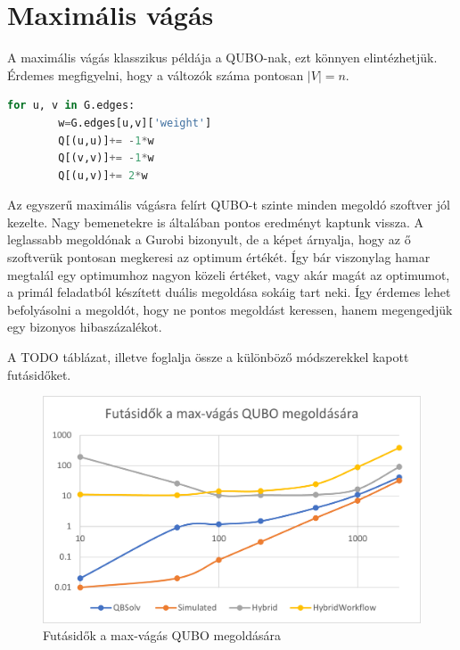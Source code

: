 \section{Maximális vágás}

A maximális vágás klasszikus példája a QUBO-nak, ezt könnyen elintézhetjük.
Érdemes megfigyelni, hogy a változók száma pontosan $|V|=n$.

\begin{lstlisting}[language=python,caption=Max-cut QUBO,label=code:maxCutQUBO]
	for u, v in G.edges:
		w=G.edges[u,v]['weight']
		Q[(u,u)]+= -1*w
		Q[(v,v)]+= -1*w
		Q[(u,v)]+= 2*w
\end{lstlisting}


Az egyszerű maximális vágásra felírt QUBO-t szinte minden megoldó szoftver jól kezelte. Nagy bemenetekre is általában pontos eredményt kaptunk vissza. A leglassabb megoldónak a Gurobi bizonyult, de a képet árnyalja, hogy az ő szoftverük pontosan megkeresi az optimum értékét. Így bár viszonylag hamar megtalál egy optimumhoz nagyon közeli értéket, vagy akár magát az optimumot, a primál feladatból készített duális megoldása sokáig tart neki. Így érdemes lehet befolyásolni a megoldót, hogy ne pontos megoldást keressen, hanem megengedjük egy bizonyos hibaszázalékot.

A TODO táblázat, illetve  foglalja össze a különböző módszerekkel kapott futásidőket.

\begin{figure}[!ht]
	\centering
	\includegraphics[width=150mm, keepaspectratio]{figures/diagrams/maxCutQUBO.png}
	\caption{Futásidők a max-vágás QUBO megoldására}
	\label{fig:maxCutQUBO}
\end{figure}

